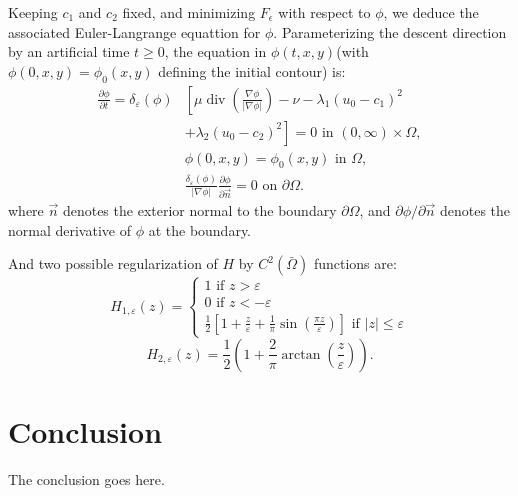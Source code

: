 \documentclass[journal]{IEEEtran}
\begin{document}
Keeping $c_1$ and $c_2$ fixed, and minimizing $F_\epsilon$ with respect to $\phi$, we deduce the associated Euler-Langrange equattion for $\phi$. Parameterizing the descent direction by an artificial time $t\geq 0$, the equation in $\phi(t,x,y)$(with $\phi(0,x,y)=\phi_0(x,y)$ defining the initial contour) is:
\begin{equation}\begin{aligned}
    \frac{\partial \phi}{\partial t}=\delta_{\varepsilon}(\phi) &\left[\mu \operatorname{div}\left(\frac{\nabla \phi}{|\nabla \phi|}\right)-\nu-\lambda_{1}\left(u_{0}-c_{1}\right)^{2}\right.\\
    &\left.+\lambda_{2}\left(u_{0}-c_{2}\right)^{2}\right]=0 \text { in }(0, \infty) \times \Omega, \\
    & \phi(0, x, y)=\phi_{0}(x, y) \text { in } \Omega, \\
    & \frac{\delta_{\varepsilon}(\phi)}{|\nabla \phi|} \frac{\partial \phi}{\partial \vec{n}}=0 \text { on } \partial \Omega.
\end{aligned}\end{equation}
where $\vec{n}$ denotes the exterior normal to the boundary $\partial\Omega$, and $\partial\phi/\partial\vec{n}$ denotes the normal derivative of $\phi$ at the boundary.

And two possible regularization of $H$ by $C^2(\bar{\Omega})$ functions are:
\begin{equation}
  H_{1, \varepsilon}(z)=\left\{\begin{array}{l}
  1 \text { if } z>\varepsilon \\
  0 \text { if } z<-\varepsilon \\
  \frac{1}{2}\left[1+\frac{z}{\varepsilon}+\frac{1}{\pi} \sin \left(\frac{\pi z}{\varepsilon}\right)\right] \text { if }|z| \leq \varepsilon
  \end{array}\right.
\end{equation}
\begin{equation}
  H_{2, \varepsilon}(z)=\frac{1}{2}\left(1+\frac{2}{\pi} \arctan \left(\frac{z}{\varepsilon}\right)\right) .
\end{equation}
\section{Conclusion}
The conclusion goes here.\cite{han2020survey}

\ifCLASSOPTIONcaptionsoff
  \newpage
\fi



\end{document}
